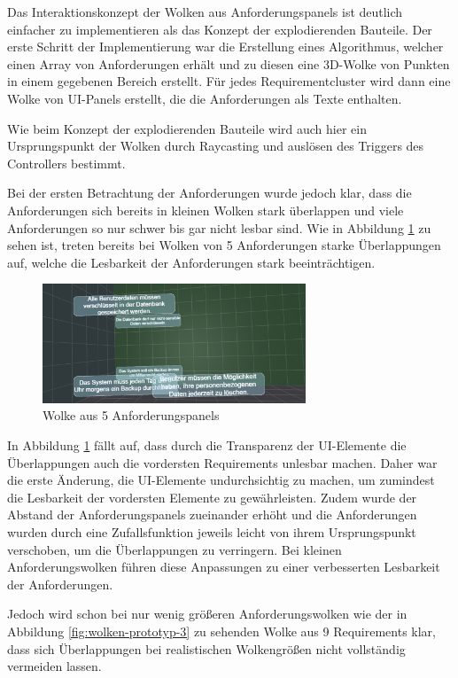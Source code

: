 Das Interaktionskonzept der Wolken aus Anforderungspanels ist deutlich einfacher zu implementieren als das Konzept der explodierenden Bauteile.
Der erste Schritt der Implementierung war die Erstellung eines Algorithmus, welcher einen Array von Anforderungen erhält und zu diesen eine 3D-Wolke von Punkten in einem gegebenen Bereich erstellt.
Für jedes Requirementcluster wird dann eine Wolke von UI-Panels erstellt, die die Anforderungen als Texte enthalten.

Wie beim Konzept der explodierenden Bauteile wird auch hier ein Ursprungspunkt der Wolken durch Raycasting und auslösen des Triggers des Controllers bestimmt.

Bei der ersten Betrachtung der Anforderungen wurde jedoch klar, dass die Anforderungen sich bereits in kleinen Wolken stark überlappen und viele Anforderungen so nur schwer bis gar nicht lesbar sind.
Wie in Abbildung \ref{fig:wolken-prototyp} zu sehen ist, treten bereits bei Wolken von 5 Anforderungen  starke Überlappungen auf, welche die Lesbarkeit der Anforderungen stark beeinträchtigen.

\begin{figure}[H]
    \centering
    \includegraphics[width=0.7\textwidth]{images/WolkenPrototyp.png}
    \caption{Wolke aus 5 Anforderungspanels}
    \label{fig:wolken-prototyp}
\end{figure}

In Abbildung \ref{fig:wolken-prototyp} fällt auf, dass durch die Transparenz der UI-Elemente die Überlappungen auch die vordersten Requirements unlesbar machen.
Daher war die erste Änderung, die UI-Elemente undurchsichtig zu machen, um zumindest die Lesbarkeit der vordersten Elemente zu gewährleisten.
Zudem wurde der Abstand der Anforderungspanels zueinander erhöht und die Anforderungen wurden durch eine Zufallsfunktion jeweils leicht von ihrem Ursprungspunkt verschoben, um die Überlappungen zu verringern.
Bei kleinen Anforderungswolken führen diese Anpassungen zu einer verbesserten Lesbarkeit der Anforderungen.

Jedoch wird schon bei nur wenig größeren Anforderungswolken wie der in Abbildung \ref{fig:wolken-prototyp-3} zu sehenden Wolke aus 9 Requirements klar, dass sich Überlappungen bei realistischen Wolkengrößen nicht vollständig vermeiden lassen.

